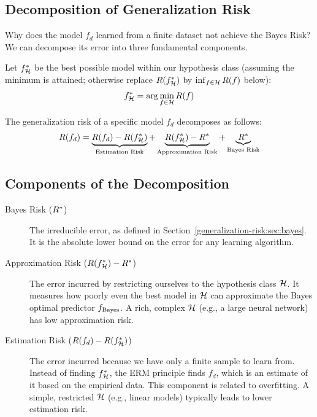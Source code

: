 \begin{notechapter}
\section{Decomposition of Generalization Risk}
\label{generalization-risk:sec:decomposition}

Why does the model \( f_d \) learned from a finite dataset not achieve the Bayes Risk? We can decompose its error into three fundamental components.

Let \( f_{\mathcal{H}}^{*} \) be the best possible model within our hypothesis class (assuming the minimum is attained; otherwise replace \( R(f_{\mathcal{H}}^{*}) \) by \( \inf_{f\in\mathcal{H}}R(f) \) below):
\[
f_{\mathcal{H}}^{*} = \arg\min_{f \in \mathcal{H}} R(f)
\]

The generalization risk of a specific model \( f_d \) decomposes as follows:
\begin{equation}
R(f_d) = \underbrace{R(f_d) - R(f_{\mathcal{H}}^{*})}_{\text{Estimation Risk}} + \underbrace{R(f_{\mathcal{H}}^{*}) - R^{*}}_{\text{Approximation Risk}} + \underbrace{R^{*}}_{\text{Bayes Risk}}
\label{generalization-risk:eq:decomposition}
\end{equation}

\subsection{Components of the Decomposition}

\begin{description}
    \item[Bayes Risk (\( R^{*} \))] The irreducible error, as defined in Section~\ref{generalization-risk:sec:bayes}. It is the absolute lower bound on the error for any learning algorithm.

    \item[Approximation Risk (\( R(f_{\mathcal{H}}^{*}) - R^{*} \))] The error incurred by restricting ourselves to the hypothesis class \( \mathcal{H} \). It measures how poorly even the best model in \( \mathcal{H} \) can approximate the Bayes optimal predictor \( f_{\text{Bayes}} \). A rich, complex \( \mathcal{H} \) (e.g., a large neural network) has low approximation risk.

    \item[Estimation Risk (\( R(f_d) - R(f_{\mathcal{H}}^{*}) \))] The error incurred because we have only a finite sample to learn from. Instead of finding \( f_{\mathcal{H}}^{*} \), the ERM principle finds \( f_d \), which is an estimate of it based on the empirical data. This component is related to overfitting. A simple, restricted \( \mathcal{H} \) (e.g., linear models) typically leads to lower estimation risk.
\end{description}


\end{notechapter}
